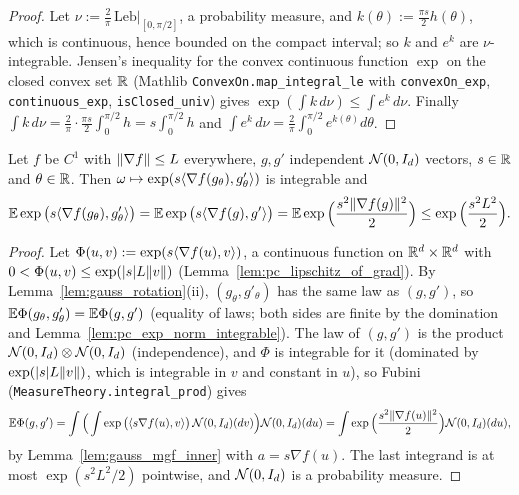 \begin{proof}
\leanok
Let $\nu := \frac2\pi\,\mathrm{Leb}|_{[0,\pi/2]}$, a probability measure, and
$k(\theta) := \frac{\pi s}{2}h(\theta)$, which is continuous, hence bounded on the compact
interval; so $k$ and $e^{k}$ are $\nu$-integrable. Jensen's inequality for the convex
continuous function $\exp$ on the closed convex set $\mathbb{R}$ (Mathlib
\texttt{ConvexOn.map\_integral\_le} with \texttt{convexOn\_exp}, \texttt{continuous\_exp},
\texttt{isClosed\_univ}) gives $\exp(\int k\,d\nu) \le \int e^{k}\,d\nu$. Finally
$\int k\,d\nu = \frac2\pi\cdot\frac{\pi s}{2}\int_0^{\pi/2}h = s\int_0^{\pi/2}h$ and
$\int e^k\,d\nu = \frac2\pi\int_0^{\pi/2}e^{k(\theta)}d\theta$.
\end{proof}

\begin{lemma}\label{lem:pc_rotated_mgf_bound}
\leanok
{}
Let $f$ be $C^1$ with $\lVert \nabla f \rVert \le L$ everywhere, $g, g'$ independent
$\mathcal{N}(0,I_d)$ vectors, $s \in \mathbb{R}$ and $\theta \in \mathbb{R}$. Then
$\omega \mapsto \exp(s\langle \nabla f(g_\theta), g'_\theta \rangle)$ is integrable and
\[
  \mathbb{E}\exp\big(s\langle \nabla f(g_\theta), g'_\theta \rangle\big)
  = \mathbb{E}\exp\big(s\langle \nabla f(g), g' \rangle\big)
  = \mathbb{E}\exp\Big(\frac{s^2\lVert \nabla f(g) \rVert^2}{2}\Big) \le \exp\Big(\frac{s^2L^2}{2}\Big).
\]
\end{lemma}

\begin{proof}
\leanok
{}
Let $\Phi(u,v) := \exp(s\langle \nabla f(u), v \rangle)$, a continuous function on $\mathbb{R}^d\times\mathbb{R}^d$ with
$0 < \Phi(u,v) \le \exp(\lvert s \rvert L\lVert v \rVert)$ (Lemma~\ref{lem:pc_lipschitz_of_grad}). By
Lemma~\ref{lem:gauss_rotation}(ii), $(g_\theta, g'_\theta)$ has the same law as $(g,g')$, so
$\mathbb{E}\Phi(g_\theta,g'_\theta) = \mathbb{E}\Phi(g,g')$ (equality of laws; both sides are finite by the
domination and Lemma~\ref{lem:pc_exp_norm_integrable}). The law of $(g,g')$ is the product
$\mathcal{N}(0,I_d)\otimes\mathcal{N}(0,I_d)$ (independence), and $\Phi$ is integrable for it (dominated
by $\exp(\lvert s \rvert L\lVert v \rVert)$, which is integrable in $v$ and constant in $u$), so Fubini
(\texttt{MeasureTheory.integral\_prod}) gives
\[
  \mathbb{E}\Phi(g,g') = \int\Big(\int\exp\big(\langle s\nabla f(u), v \rangle\big)\,\mathcal{N}(0,I_d)(dv)\Big)\mathcal{N}(0,I_d)(du)
  = \int\exp\Big(\frac{s^2\lVert \nabla f(u) \rVert^2}{2}\Big)\mathcal{N}(0,I_d)(du),
\]
by Lemma~\ref{lem:gauss_mgf_inner} with $a = s\nabla f(u)$. The last integrand is at most
$\exp(s^2L^2/2)$ pointwise, and $\mathcal{N}(0,I_d)$ is a probability measure.
\end{proof}

